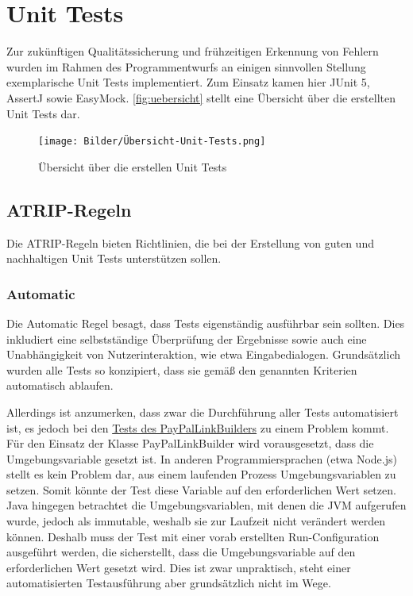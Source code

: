 \chapter{Unit Tests}
Zur zukünftigen Qualitätssicherung und frühzeitigen Erkennung von Fehlern wurden im Rahmen des Programmentwurfs an einigen sinnvollen Stellung exemplarische Unit Tests implementiert.
Zum Einsatz kamen hier JUnit 5, AssertJ sowie EasyMock.
\autoref{fig:uebersicht} stellt eine Übersicht über die erstellten Unit Tests dar.

\begin{figure}[H]
    \centering
    \texttt{[image: Bilder/Übersicht-Unit-Tests.png]}
    \caption{Übersicht über die erstellen Unit Tests}
    \label{fig:uebersicht}
\end{figure}

\section{ATRIP-Regeln}
Die ATRIP-Regeln bieten Richtlinien, die bei der Erstellung von guten und nachhaltigen Unit Tests unterstützen sollen.

\subsection{Automatic}
\label{sec:automatic}
Die Automatic Regel besagt, dass Tests eigenständig ausführbar sein sollten.
Dies inkludiert eine selbstständige Überprüfung der Ergebnisse sowie auch eine Unabhängigkeit von Nutzerinteraktion, wie etwa Eingabedialogen.
Grundsätzlich wurden alle Tests so konzipiert, dass sie gemäß den genannten Kriterien automatisch ablaufen.

Allerdings ist anzumerken, dass zwar die Durchführung aller Tests automatisiert ist, es jedoch bei den \href{https://github.com/yschiebelhut/carpool-java/blob/d0315b99dcd93e582ef60fddb185b7962bcb0076/0-carpool-java-integration/src/test/java/paypal/PayPalLinkBuilderTest.java}{Tests des PayPalLinkBuilders} zu einem Problem kommt.
Für den Einsatz der Klasse PayPalLinkBuilder wird vorausgesetzt, dass die Umgebungsvariable  gesetzt ist.
In anderen Programmiersprachen (etwa Node.js) stellt es kein Problem dar, aus einem laufenden Prozess Umgebungsvariablen zu setzen.
Somit könnte der Test diese Variable auf den erforderlichen Wert setzen.
Java hingegen betrachtet die Umgebungsvariablen, mit denen die JVM aufgerufen wurde, jedoch als immutable, weshalb sie zur Laufzeit nicht verändert werden können.
Deshalb muss der Test mit einer vorab erstellten Run-Configuration ausgeführt werden, die sicherstellt, dass die Umgebungsvariable auf den erforderlichen Wert gesetzt wird.
Dies ist zwar unpraktisch, steht einer automatisierten Testausführung aber grundsätzlich nicht im Wege.

